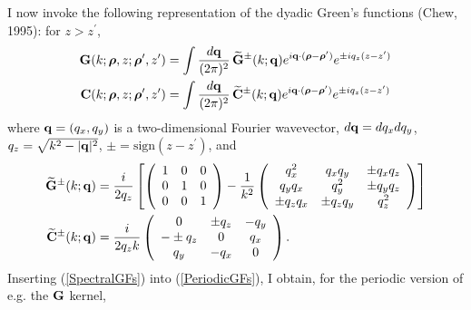 \documentclass[letterpaper]{article}
\newcommand{\wt}{\widetilde}
\begin{document}
I now invoke the following representation of the dyadic
Green's functions (Chew, 1995): for $z>z^\prime$,
\begin{subequations}
\begin{align}
 \vb G(k; \vbrho, z; \vbrho^\prime, z^\prime)
&= \int \frac{d\vb q}{(2\pi)^2}
   \,
   \vb{\wt G}^\pm (k; \vb q)
      e^{i\vb q\cdot (\vbrho-\vbrho^\prime)}
     e^{\pm iq_z(z-z^\prime)}
\\
 \vb C(k; \vbrho, z; \vbrho^\prime, z^\prime)
&=\int \frac{d\vb q}{(2\pi)^2}
  \, 
  \vb{\wt C}^\pm (k; \vb q) e^{i\vb q\cdot (\vbrho-\vbrho^\prime)}
                   e^{\pm iq_z(z-z^\prime)}
\end{align}
\label{SpectralGFs}%
\end{subequations}
where $\mathbf{q}=(q_x,q_y)$ is a two-dimensional Fourier wavevector,
$d\mathbf{q}=dq_x dq_y$,
$q_z=\sqrt{k^2-|\mathbf{q}|^2}$, $\pm = \text{sign}(z-z^\prime)$,
and
\begin{align*}
 \vb{\wt G}^\pm(k; \vb q)
   &=\frac{i}{2 q_z}
     \left[
     \left(\begin{array}{ccc}
      1 & 0 & 0 \\ 
      0 & 1 & 0 \\ 
      0 & 0 & 1
     \end{array}\right)
     -\frac{1}{k^2}
     \left(\begin{array}{ccc}
      q_x^2       & q_x q_y     & \pm q_x q_z \\
      q_yq_x      & q_y^2       & \pm q_y q_z \\
      \pm q_z q_x & \pm q_z q_y & q_z^2
     \end{array}\right)\right]
\\
 \vb{\wt C}^\pm (k; \vb q)
   &=\frac{i}{2q_z k}
     \left(\begin{array}{ccc}
           0 & \pm q_z & -q_y \\
    -\pm q_z &       0 &  q_x \\
         q_y &    -q_x &    0
     \end{array}\right).
\end{align*}
Inserting (\ref{SpectralGFs}) into (\ref{PeriodicGFs}), I 
obtain, for the periodic version of e.g. the $\mathbf{G}$ kernel,
\end{document}

